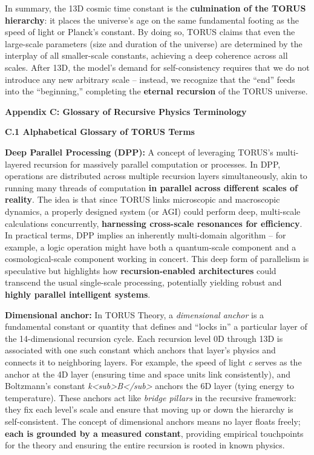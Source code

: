In summary, the 13D cosmic time constant is the \textbf{culmination of
the TORUS hierarchy}: it places the universe's age on the same
fundamental footing as the speed of light or Planck's constant. By doing
so, TORUS claims that even the large-scale parameters (size and duration
of the universe) are determined by the interplay of all smaller-scale
constants, achieving a deep coherence across all scales. After 13D, the
model's demand for self-consistency requires that we do not introduce
any new arbitrary scale -- instead, we recognize that the ``end'' feeds
into the ``beginning,'' completing the \textbf{eternal recursion} of the
TORUS universe​.

\textbf{Appendix C: Glossary of Recursive Physics Terminology}

\textbf{C.1 Alphabetical Glossary of TORUS Terms}

\textbf{Deep Parallel Processing (DPP):} A concept of leveraging TORUS's
multi-layered recursion for massively parallel computation or processes.
In DPP, operations are distributed across multiple recursion layers
simultaneously, akin to running many threads of computation \textbf{in
parallel across different scales of reality}. The idea is that since
TORUS links microscopic and macroscopic dynamics, a properly designed
system (or AGI) could perform deep, multi-scale calculations
concurrently, \textbf{harnessing cross-scale resonances for
efficiency}​. In practical terms, DPP implies an inherently multi-domain
algorithm -- for example, a logic operation might have both a
quantum-scale component and a cosmological-scale component working in
concert​. This deep form of parallelism is speculative but highlights
how \textbf{recursion-enabled architectures} could transcend the usual
single-scale processing, potentially yielding robust and \textbf{highly
parallel intelligent systems}.

\textbf{Dimensional anchor:} In TORUS Theory, a \emph{dimensional
anchor} is a fundamental constant or quantity that defines and ``locks
in'' a particular layer of the 14-dimensional recursion cycle. Each
recursion level 0D through 13D is associated with one such constant
which anchors that layer's physics and connects it to neighboring
layers​. For example, the speed of light \emph{c} serves as the anchor
at the 4D layer (ensuring time and space units link consistently), and
Boltzmann's constant
\emph{k\textless{}sub\textgreater{}B\textless{}/sub\textgreater{}}
anchors the 6D layer (tying energy to temperature)​. These anchors act
like \emph{bridge pillars} in the recursive framework: they fix each
level's scale and ensure that moving up or down the hierarchy is
self-consistent. The concept of dimensional anchors means no layer
floats freely; \textbf{each is grounded by a measured constant},
providing empirical touchpoints for the theory and ensuring the entire
recursion is rooted in known physics​.

